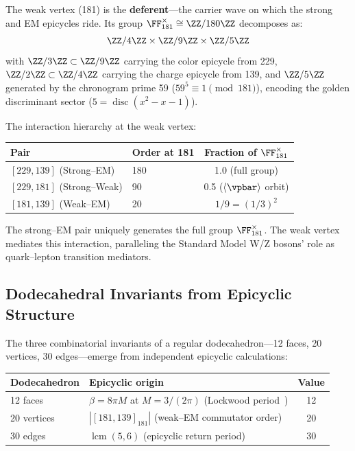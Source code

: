 The weak vertex (181) is the \textbf{deferent}---the carrier wave on which the strong and EM epicycles ride. Its group $\FF_{181}^{\times} \cong \ZZ/180\ZZ$ decomposes as:
\begin{equation}
    \ZZ/4\ZZ \times \ZZ/9\ZZ \times \ZZ/5\ZZ
\end{equation}
with $\ZZ/3\ZZ \subset \ZZ/9\ZZ$ carrying the color epicycle from 229, $\ZZ/2\ZZ \subset \ZZ/4\ZZ$ carrying the charge epicycle from 139, and $\ZZ/5\ZZ$ generated by the chronogram prime 59 ($59^5 \equiv 1 \pmod{181}$), encoding the golden discriminant sector ($5 = \operatorname{disc}(x^2 - x - 1)$).

The interaction hierarchy at the weak vertex:
\begin{center}
\begin{tabular}{llc}
\hline
Pair & Order at 181 & Fraction of $\FF_{181}^{\times}$ \\
\hline
$[229, 139]$ (Strong--EM) & 180 & 1.0 (full group) \\
$[229, 181]$ (Strong--Weak) & 90 & 0.5 ($\langle\vpbar\rangle$ orbit) \\
$[181, 139]$ (Weak--EM) & 20 & $1/9 = (1/3)^2$ \\
\hline
\end{tabular}
\end{center}

The strong--EM pair uniquely generates the full group $\FF_{181}^{\times}$. The weak vertex mediates this interaction, paralleling the Standard Model W/Z bosons' role as quark--lepton transition mediators.

\subsection{Dodecahedral Invariants from Epicyclic Structure}

The three combinatorial invariants of a regular dodecahedron---12 faces, 20 vertices, 30 edges---emerge from independent epicyclic calculations:
\begin{center}
\begin{tabular}{llc}
\hline
Dodecahedron & Epicyclic origin & Value \\
\hline
12 faces & $\beta = 8\pi M$ at $M = 3/(2\pi)$ (Lockwood period~\cite{lockwood_v11}) & 12 \\
20 vertices & $|[181,139]_{181}|$ (weak--EM commutator order) & 20 \\
30 edges & $\operatorname{lcm}(5, 6)$ (epicyclic return period) & 30 \\
\hline
\end{tabular}
\end{center}

